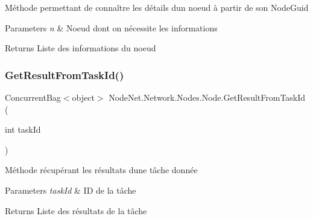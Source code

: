 Méthode permettant de connaître les détails d\textquotesingle{}un noeud à partir de son Node\+Guid 


\begin{DoxyParams}{Parameters}
{\em n} & Noeud dont on nécessite les informations\\
\hline
\end{DoxyParams}
\begin{DoxyReturn}{Returns}
Liste des informations du noeud
\end{DoxyReturn}
\mbox{\label{class_node_net_1_1_network_1_1_nodes_1_1_node_afce378baeedbf4875673f4f3e124eb91}} 
\subsubsection{\texorpdfstring{Get\+Result\+From\+Task\+Id()}{GetResultFromTaskId()}}
{\footnotesize\ttfamily Concurrent\+Bag$<$object$>$ Node\+Net.\+Network.\+Nodes.\+Node.\+Get\+Result\+From\+Task\+Id (\begin{DoxyParamCaption}\item[{int}]{task\+Id }\end{DoxyParamCaption})\hspace{0.3cm}{\ttfamily [protected]}}



Méthode récupérant les résultats d\textquotesingle{}une tâche donnée 


\begin{DoxyParams}{Parameters}
{\em task\+Id} & ID de la tâche\\
\hline
\end{DoxyParams}
\begin{DoxyReturn}{Returns}
Liste des résultats de la tâche
\end{DoxyReturn}
\mbox{\label{class_node_net_1_1_network_1_1_nodes_1_1_node_a63e45bca1811b06988d6158965205daf}} 
